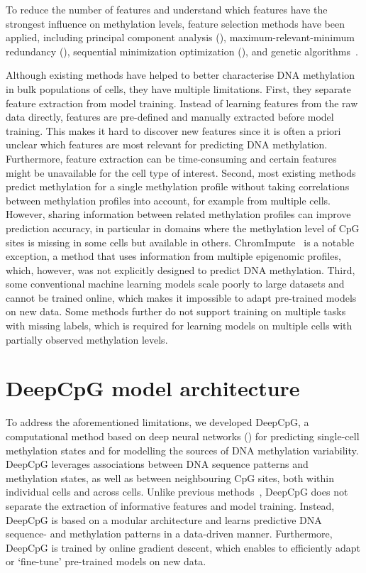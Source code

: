 To reduce the number of features and understand which features have the strongest influence on methylation levels, feature selection methods have been applied, including principal component analysis (\citep{zheng_enhancement_2011,zheng_cpgimethpred:_2013}), maximum-relevant-minimum redundancy (\citep{lu_predicting_2010}), sequential minimization optimization (\citep{malousi_predictive_2014}), and genetic algorithms~\citep{li_prediction_2014}.

Although existing methods have helped to better characterise DNA methylation in bulk populations of cells, they have multiple limitations. First, they separate feature extraction from model training. Instead of learning features from the raw data directly, features are pre-defined and manually extracted before model training. This makes it hard to discover new features since it is often a priori unclear which features are most relevant for predicting DNA methylation. Furthermore, feature extraction can be time-consuming and certain features might be unavailable for the cell type of interest. Second, most existing methods predict methylation for a single methylation profile without taking correlations between methylation profiles into account, for example from multiple cells. However, sharing information between related methylation profiles can improve prediction accuracy, in particular in domains where the methylation level of CpG sites is missing in some cells but available in others. ChromImpute~\citep{ernst_large-scale_2015} is a notable exception, a method that uses information from multiple epigenomic profiles, which, however, was not explicitly designed to predict DNA methylation. Third, some conventional machine learning models scale poorly to large datasets and cannot be trained online, which makes it impossible to adapt pre-trained models on new data. Some methods further do not support training on multiple tasks with missing labels, which is required for learning models on multiple cells with partially observed methylation levels.


\section{DeepCpG model architecture} \label{sec:dcpg_model}

To address the aforementioned limitations, we developed DeepCpG, a computational method based on deep neural networks () for predicting single-cell methylation states and for modelling the sources of DNA methylation variability. DeepCpG leverages associations between DNA sequence patterns and methylation states, as well as between neighbouring CpG sites, both within individual cells and across cells. Unlike previous methods~\citep{bhasin_prediction_2005,li_prediction_2014,liu_idna-methyl:_2015,lu_predicting_2010,stevens_estimating_2013,zhang_predicting_2015,zhou_prediction_2012}, DeepCpG does not separate the extraction of informative features and model training. Instead, DeepCpG is based on a modular architecture and learns predictive DNA sequence- and methylation patterns in a data-driven manner. Furthermore, DeepCpG is trained by online gradient descent, which enables to efficiently adapt or `fine-tune' pre-trained models on new data.

